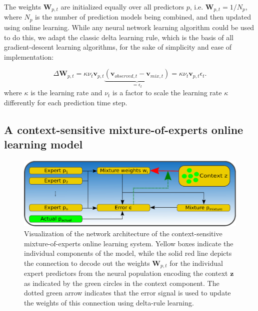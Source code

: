 The weights $ \mathbf{W}_{ p ,t}$ are initialized equally over all predictors $ p$, i.e. $\mathbf{W}_{ p ,t} = 1/N_p$, where $N_p$ is the number of prediction models being combined, and then updated using online learning.
While any neural network learning algorithm could be used to do this, we adapt the classic delta learning rule, which is the basis of all gradient-descent learning algorithms, for the sake of simplicity and ease of implementation:

\begin{equation}
  \label{eq:mix_learning1}
\Delta\mathbf{W}_{p,t} = \kappa \nu_{t} \mathbf{v}_{p,t} \underbrace{(\mathbf{v}_{observed,t}-\mathbf{v}_{mix,t})}_{=\epsilon_t} = \kappa \nu_{t} \mathbf{v}_{p,t} \epsilon_t.
\end{equation}
where $\kappa$ is the learning rate and $\nu_{t}$ is a factor to scale the learning rate $\kappa$ differently for each prediction time step.

\subsection{A context-sensitive mixture-of-experts online learning model}%
\label{subsec:a_context_sensitive_mixture_of_experts_online_learning_model}

\begin{figure}[t!]
    \centering
    \includegraphics[width=\textwidth]{imgs/mix_system_arch.eps}
    \caption{Visualization of the network architecture of the context-sensitive mixture-of-experts online learning system.
    Yellow boxes indicate the individual components of the model, while the solid red line depicts the connection to decode out the weights $ \mathbf{W}_{p,t}$ for the individual expert predictors from the neural population encoding the context $\mathbf{z}$ as indicated by the green circles in the context component.
    The dotted green arrow indicates that the error signal is used to update the weights of this connection using delta-rule learning.}
    \label{fig:mix_context_sensitive_system_arch}
\end{figure}

